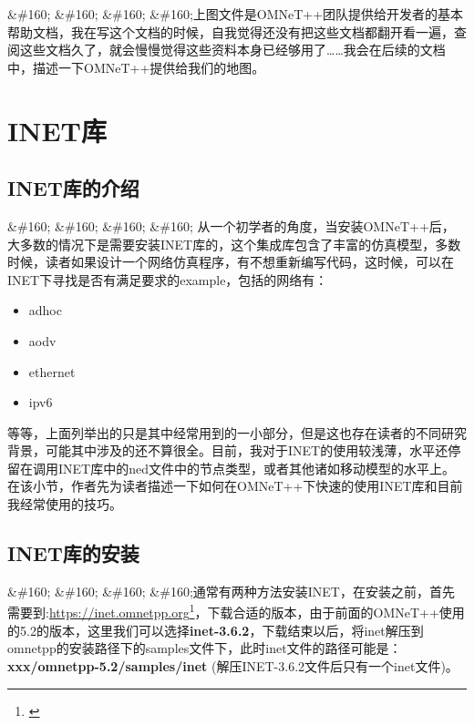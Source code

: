 \&\#160; \&\#160; \&\#160; \&\#160;上图文件是OMNeT++团队提供给开发者的基本帮助文档，我在写这个文档的时候，自我觉得还没有把这些文档都翻开看一遍，查阅这些文档久了，就会慢慢觉得这些资料本身已经够用了{\ldots}{\ldots}我会在后续的文档中，描述一下OMNeT++提供给我们的地图。

\section{INET库}
\label{inet库}

\subsection{INET库的介绍}
\label{inet库的介绍}

\&\#160; \&\#160; \&\#160; \&\#160; 从一个初学者的角度，当安装OMNeT++后，大多数的情况下是需要安装INET库的，这个集成库包含了丰富的仿真模型，多数时候，读者如果设计一个网络仿真程序，有不想重新编写代码，这时候，可以在INET下寻找是否有满足要求的example，包括的网络有：

\begin{itemize}
\item adhoc

\item aodv

\item ethernet

\item ipv6

\end{itemize}

等等，上面列举出的只是其中经常用到的一小部分，但是这也存在读者的不同研究背景，可能其中涉及的还不算很全。目前，我对于INET的使用较浅薄，水平还停留在调用INET库中的ned文件中的节点类型，或者其他诸如移动模型的水平上。在该小节，作者先为读者描述一下如何在OMNeT++下快速的使用INET库和目前我经常使用的技巧。

\subsection{INET库的安装}
\label{inet库的安装}

\&\#160; \&\#160; \&\#160; \&\#160;通常有两种方法安装INET，在安装之前，首先需要到:\href{}{https:\slash \slash inet.omnetpp.org}\footnote{\href{}{}}，下载合适的版本，由于前面的OMNeT++使用的5.2的版本，这里我们可以选择\textbf{inet-3.6.2}，下载结束以后，将inet解压到omnetpp的安装路径下的samples文件下，此时inet文件的路径可能是：
\textbf{xxx\slash omnetpp-5.2\slash samples\slash inet}
(解压INET-3.6.2文件后只有一个inet文件)。

